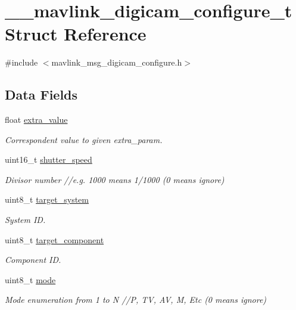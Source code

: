 \hypertarget{struct____mavlink__digicam__configure__t}{\section{\+\_\+\+\_\+mavlink\+\_\+digicam\+\_\+configure\+\_\+t Struct Reference}
\label{struct____mavlink__digicam__configure__t}
}


{\ttfamily \#include $<$mavlink\+\_\+msg\+\_\+digicam\+\_\+configure.\+h$>$}

\subsection*{Data Fields}
\begin{DoxyCompactItemize}
\item 
float \hyperlink{struct____mavlink__digicam__configure__t_a70d6f6dce20e064e7ba77083abe7f0e6}{extra\+\_\+value}
\begin{DoxyCompactList}\small\item\em Correspondent value to given extra\+\_\+param. \end{DoxyCompactList}\item 
uint16\+\_\+t \hyperlink{struct____mavlink__digicam__configure__t_af76292aaf6b8c35b7573a4cbf7b4fdb0}{shutter\+\_\+speed}
\begin{DoxyCompactList}\small\item\em Divisor number //e.g. 1000 means 1/1000 (0 means ignore) \end{DoxyCompactList}\item 
uint8\+\_\+t \hyperlink{struct____mavlink__digicam__configure__t_a66c0795ecbfe0f03899bec91b155d8d1}{target\+\_\+system}
\begin{DoxyCompactList}\small\item\em System I\+D. \end{DoxyCompactList}\item 
uint8\+\_\+t \hyperlink{struct____mavlink__digicam__configure__t_a46cbc82dab1af4e8b7e30c37bf07d5cd}{target\+\_\+component}
\begin{DoxyCompactList}\small\item\em Component I\+D. \end{DoxyCompactList}\item 
uint8\+\_\+t \hyperlink{struct____mavlink__digicam__configure__t_ae05b3c75132b340c8163f8211ae04302}{mode}
\begin{DoxyCompactList}\small\item\em Mode enumeration from 1 to N //\+P, T\+V, A\+V, M, Etc (0 means ignore) \end{DoxyCompactList}\item 

\end{DoxyCompactItemize}
